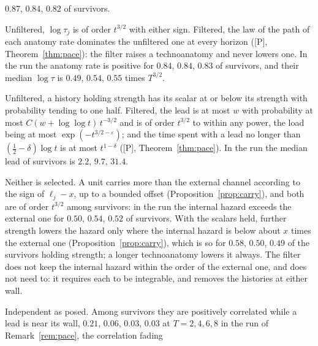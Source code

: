 \begin{description}
$0.87$, $0.84$, $0.82$ of survivors.
\item[The scalars and their rates.] Unfiltered, $\log\tau_j$ is of order
$t^{3/2}$ with either sign. Filtered, the law of the path of each anatomy
rate dominates the unfiltered one at every horizon ([P], Theorem~\ref{thm:pace}): the
filter raises a technoanatomy and never lowers one. In the run the
anatomy rate is positive for $0.84$, $0.84$, $0.83$ of
survivors, and their median $\log\tau$ is $0.49$, $0.54$, $0.55$
times $T^{3/2}$.
\item[The leads and the loads.] Unfiltered, a history holding strength
has its scalar at or below its strength with probability tending to one
half. Filtered, the lead is at most $w$ with probability at most
$C(w+\log\log t)\,t^{-3/2}$ and is of order $t^{3/2}$ to within any power,
the load being at most $\exp(-t^{3/2-\varepsilon})$; and the time spent
with a lead no longer than $(\tfrac12-\delta)\log t$ is at most
$t^{1-\delta}$ ([P], Theorem~\ref{thm:pace}). In the run the median lead of survivors is
$2.2$, $9.7$, $31.4$.
\item[Which channel carries the hazard.] Neither is selected. A unit
carries more than the external channel according to the sign of
$\ell_j-x$, up to a bounded offset (Proposition~\ref{prop:carry}), and both are of order
$t^{3/2}$ among survivors: in the run the internal hazard exceeds the
external one for $0.50$, $0.54$, $0.52$ of survivors. With
the scalars held, further strength lowers the hazard only where the
internal hazard is below about $x$ times the external one (Proposition~\ref{prop:carry}),
which is so for $0.58$, $0.50$, $0.49$ of the survivors holding
strength; a longer technoanatomy lowers it always. The filter does not
keep the internal hazard within the order of the external one, and does
not need to: it requires each to be integrable, and removes the histories
at either wall.
\item[The two rates together.] Independent as posed. Among survivors
they are positively correlated while a lead is near its wall, $0.21$,
$0.06$, $0.03$, $0.03$ at $T=2,4,6,8$ in the run of Remark~\ref{rem:pace}, the correlation fading

\end{description}
